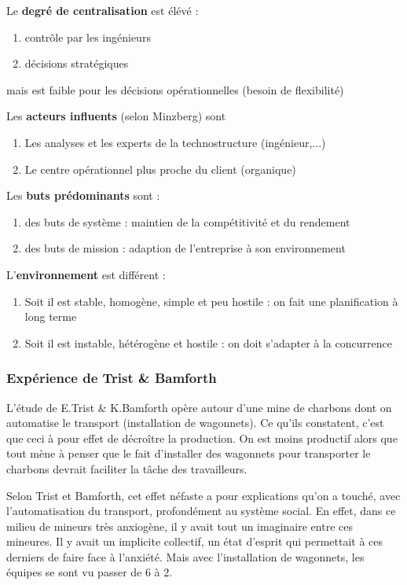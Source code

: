 \documentclass[12pt]{article}
\begin{document}
	Le \textbf{degré de centralisation} est élévé :
	\begin{enumerate}
	 \item contrôle par les ingénieurs
	 \item décisions stratégiques
	\end{enumerate}
	mais est faible pour les décisions opérationnelles (besoin de flexibilité)
	
	Les \textbf{acteurs influents} (selon Minzberg) sont
	\begin{enumerate}
	 \item Les analyses et les experts de la technostructure (ingénieur,...)
	 \item Le centre opérationnel plus proche du client (organique)
	\end{enumerate}
	
	Les \textbf{buts prédominants} sont :
	\begin{enumerate}
	 \item des buts de système : maintien de la compétitivité et du rendement
	 \item des buts de mission : adaption de l'entreprise à son environnement
	\end{enumerate}
	
	L'\textbf{environnement} est différent :
	\begin{enumerate}
	 \item Soit il est stable, homogène, simple et peu hostile : on fait une planification à long terme
	 \item Soit il est instable, hétérogène et hostile : on doit s'adapter à la concurrence
	\end{enumerate}

	\subsubsection*{Expérience de Trist \& Bamforth}
	
	L'étude de E.Trist \& K.Bamforth opère autour d'une mine de charbons dont on automatise le transport (installation de wagonnets). Ce qu'ils constatent, c'est que ceci à pour effet de décroître la production. On est moins productif alors que tout mène à penser que le fait d'installer des wagonnets pour transporter le charbons devrait faciliter la tâche des travailleurs. \newline
	
	Selon Trist et Bamforth, cet effet néfaste a pour explications qu'on a touché, avec l'automatisation du transport, profondément au système social. En effet, dans ce milieu de mineurs très anxiogène, il y avait tout un imaginaire entre ces mineures. Il y avait un implicite collectif, un état d'esprit qui permettait à ces derniers de faire face à l'anxiété. Mais avec l'installation de wagonnets, les équipes se sont vu passer de 6 à 2. \newline
	
\end{document}
